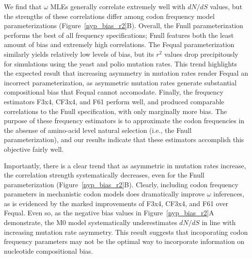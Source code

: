 \documentclass[11pt]{article}
\begin{document}
We find that $\omega$ MLEs generally correlate extremely well with $dN/dS$ values, but the strengths of these correlations differ among codon frequency model parameterizations (Figure~\ref{nyp_bias_r2}B). Overall, the Fnull parameterization performs the best of all frequency specifications; Fnull features both the least amount of bias and extremely high correlations. The Fequal parameterization similarly yields relatively low levels of bias, but its $r^2$ values drop precipitously for simulations using the yeast and polio mutation rates. This trend highlights the expected result that increasing asymmetry in mutation rates render Fequal an incorrect parameterization, as asymmetric mutation rates generate substantial compositional bias that Fequal cannot accomodate. Finally, the frequency estimators F3x4, CF3x4, and F61 perform well, and produced comparable correlations to the Fnull specification, with only marginally more bias. The purpose of these frequency estimators is to approximate the codon frequencies in the absense of amino-acid level natural selection \cite{YN00,Yang2006} (i.e., the Fnull parameterization), and our results indicate that these estimators accomplish this objective fairly well. 

Importantly, there is a clear trend that as asymmetric in mutation rates increase, the correlation strength systematically decreases, even for the Fnull parameterization (Figure~\ref{nyp_bias_r2}B). Clearly, including codon frequency parameters in mechanistic codon models does dramatically improve $\omega$ inferences, as is evidenced by the marked improvements of F3x4, CF3x4, and F61 over Fequal. Even so, as the negative bias values in Figure~\ref{nyp_bias_r2}A demonstrate, the M0 model systematically underestimates $dN/dS$ in line with increasing mutation rate asymmetry. This result suggests that incoporating codon frequency parameters may not be the optimal way to incorporate information on nucleotide compositional bias. 
\end{document}
